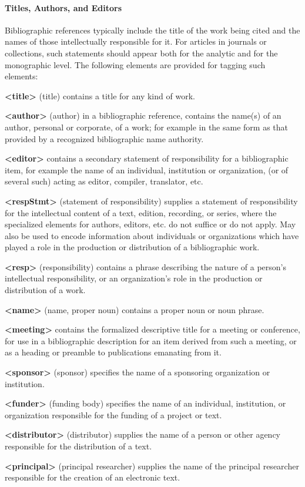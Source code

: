 \paragraph[{Titles, Authors, and Editors}]{Titles, Authors, and Editors}\label{COBICOR}\par
Bibliographic references typically include the title of the work being cited and the names of those intellectually responsible for it. For articles in journals or collections, such statements should appear both for the analytic and for the monographic level. The following elements are provided for tagging such elements: 
\begin{sansreflist}
  
\item [\textbf{<title>}] (title) contains a title for any kind of work.
\item [\textbf{<author>}] (author) in a bibliographic reference, contains the name(s) of an author, personal or corporate, of a work; for example in the same form as that provided by a recognized bibliographic name authority.
\item [\textbf{<editor>}] contains a secondary statement of responsibility for a bibliographic item, for example the name of an individual, institution or organization, (or of several such) acting as editor, compiler, translator, etc.
\item [\textbf{<respStmt>}] (statement of responsibility) supplies a statement of responsibility for the intellectual content of a text, edition, recording, or series, where the specialized elements for authors, editors, etc. do not suffice or do not apply. May also be used to encode information about individuals or organizations which have played a role in the production or distribution of a bibliographic work.
\item [\textbf{<resp>}] (responsibility) contains a phrase describing the nature of a person's intellectual responsibility, or an organization's role in the production or distribution of a work.
\item [\textbf{<name>}] (name, proper noun) contains a proper noun or noun phrase.
\item [\textbf{<meeting>}] contains the formalized descriptive title for a meeting or conference, for use in a bibliographic description for an item derived from such a meeting, or as a heading or preamble to publications emanating from it.
\item [\textbf{<sponsor>}] (sponsor) specifies the name of a sponsoring organization or institution.
\item [\textbf{<funder>}] (funding body) specifies the name of an individual, institution, or organization responsible for the funding of a project or text.
\item [\textbf{<distributor>}] (distributor) supplies the name of a person or other agency responsible for the distribution of a text.
\item [\textbf{<principal>}] (principal researcher) supplies the name of the principal researcher responsible for the creation of an electronic text.
\end{sansreflist}
